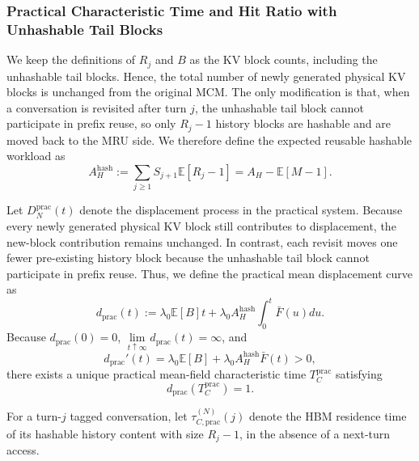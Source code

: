 \documentclass{article}
\theoremstyle{definition}
\newcommand{\E}{\mathbb E}
\begin{document}
\subsubsection{Practical Characteristic Time and Hit Ratio with Unhashable Tail Blocks}
\label{sssec: Practical Hit Ratio}


We keep the definitions of $R_j$ and $B$ as the KV block counts, including the unhashable tail blocks. Hence, the total number of newly generated physical KV blocks is unchanged from the original MCM. The only modification is that, when a conversation is revisited after turn $j$, the unhashable tail block cannot participate in prefix reuse, so only $R_j-1$ history blocks are hashable and are moved back to the MRU side. We therefore define the expected reusable hashable workload as
\begin{equation}
\label{equ: practical hashed AH}
    A_H^{\mathrm{hash}}:=\sum_{j\geq1}S_{j+1}\E[R_j-1]=A_H-\E[M-1].
\end{equation}


Let $D_N^{\mathrm{prac}}(t)$ denote the displacement process in the practical system. Because every newly generated physical KV block still contributes to displacement, the new-block contribution remains unchanged. In contrast, each revisit moves one fewer pre-existing history block because the unhashable tail block cannot participate in prefix reuse. Thus, we define the practical mean displacement curve as
\begin{equation}
\label{equ: practical displacement curve}
    d_{\mathrm{prac}}(t):=\lambda_0 \E[B]t+\lambda_0 A_H^{\mathrm{hash}}\int_0^t \bar F(u) du.
\end{equation}
Because $d_{\mathrm{prac}}(0)=0$, $\lim\limits_{t\uparrow \infty} d_{\mathrm{prac}}(t)=\infty$, and
\begin{equation*}
    d_{\mathrm{prac}}'(t)=\lambda_0\E[B]+\lambda_0 A_H^{\mathrm{hash}} \bar F(t)>0,
\end{equation*}
there exists a unique practical mean-field characteristic time $T_C^{\mathrm{prac}}$ satisfying
\begin{equation}
\label{equ: practical characteristic time}
    d_{\mathrm{prac}}(T_C^{\mathrm{prac}})=1.
\end{equation}

For a turn-$j$ tagged conversation, let $\tau_{C,\mathrm{prac}}^{(N)}(j)$ denote the HBM residence time of its hashable history content with size $R_j-1$, in the absence of a next-turn access. %
\end{document}

